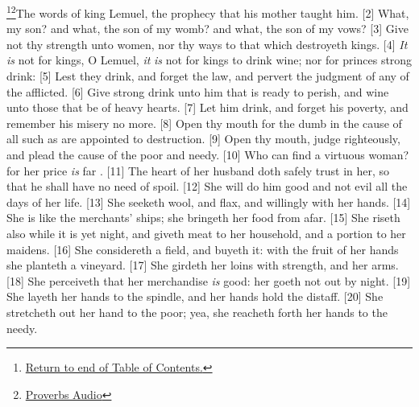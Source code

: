 \footnote{\textcolor[cmyk]{0.99998,1,0,0}{\hyperlink{TOC}{Return to end of Table of Contents.}}}\footnote{\href{https://www.audioverse.org/english/audiobibles/books/ENGKJV/O/Prov/1}{\textcolor[cmyk]{0.99998,1,0,0}{Proverbs Audio}}}\textcolor[cmyk]{0.99998,1,0,0}{The words of king Lemuel, the prophecy that his mother taught him.}
[2] \textcolor[cmyk]{0.99998,1,0,0}{What, my son? and what, the son of my womb? and what, the son of my vows?}
[3] \textcolor[cmyk]{0.99998,1,0,0}{Give not thy strength unto women, nor thy ways to that which destroyeth kings.}
[4] \textcolor[cmyk]{0.99998,1,0,0}{\emph{It} \emph{is} not for kings, O Lemuel, \emph{it} \emph{is} not for kings to drink wine; nor for princes strong drink:}
[5] \textcolor[cmyk]{0.99998,1,0,0}{Lest they drink, and forget the law, and pervert the judgment of any of the afflicted.}
[6] \textcolor[cmyk]{0.99998,1,0,0}{Give strong drink unto him that is ready to perish, and wine unto those that be of heavy hearts.}
[7] \textcolor[cmyk]{0.99998,1,0,0}{Let him drink, and forget his poverty, and remember his misery no more.}
[8] \textcolor[cmyk]{0.99998,1,0,0}{Open thy mouth for the dumb in the cause of all such as are appointed to destruction.}
[9] \textcolor[cmyk]{0.99998,1,0,0}{Open thy mouth, judge righteously, and plead the cause of the poor and needy.}
[10] \textcolor[cmyk]{0.99998,1,0,0}{Who can find a virtuous woman? for her price \emph{is} far .}
[11] \textcolor[cmyk]{0.99998,1,0,0}{The heart of her husband doth safely trust in her, so that he shall have no need of spoil.}
[12] \textcolor[cmyk]{0.99998,1,0,0}{She will do him good and not evil all the days of her life.}
[13] \textcolor[cmyk]{0.99998,1,0,0}{She seeketh wool, and flax, and  willingly with her hands.}
[14] \textcolor[cmyk]{0.99998,1,0,0}{She is like the merchants' ships; she bringeth her food from afar.}
[15] \textcolor[cmyk]{0.99998,1,0,0}{She riseth also while it is yet night, and giveth meat to her household, and a portion to her maidens.}
[16] \textcolor[cmyk]{0.99998,1,0,0}{She considereth a field, and buyeth it: with the fruit of her hands she planteth a vineyard.}
[17] \textcolor[cmyk]{0.99998,1,0,0}{She girdeth her loins with strength, and  her arms.}
[18] \textcolor[cmyk]{0.99998,1,0,0}{She perceiveth that her merchandise \emph{is} good: her  goeth not out by night.}
[19] \textcolor[cmyk]{0.99998,1,0,0}{She layeth her hands to the spindle, and her hands hold the distaff.}
[20] \textcolor[cmyk]{0.99998,1,0,0}{She stretcheth out her hand to the poor; yea, she reacheth forth her hands to the needy.}
